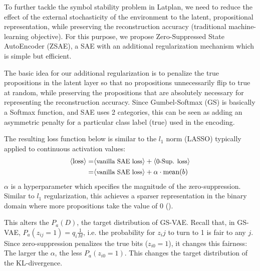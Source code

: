 
To further tackle the symbol stability problem in Latplan,
we need to reduce the effect of the external stochasticity of the environment
to the latent, propositional representation, while preserving the reconstruction accuracy
 (traditional machine-learning objective).
For this purpose, we propose Zero-Suppressed State AutoEncoder (ZSAE),
a SAE with an additional regularization mechanism which is simple but efficient.

The basic idea for our additional regularization is to penalize the
true propositions in the latent layer so that no propositions unnecessarily flip to true at random,
while preserving the propositions that are absolutely necessary for representing the reconstruction accuracy.
Since Gumbel-Softmax (GS) is basically a Softmax function,
and SAE uses 2 categories, this can be seen as adding an
asymmetric penalty for a particular class label (true) used in the encoding.

The resulting loss function below is similar to the $l_1$ norm (LASSO) typically
applied to continuous activation values:
\begin{align*}
 \brackets{\text{loss}} = & \brackets{\text{\small vanilla SAE loss}} + \brackets{\text{\small 0-Sup. loss}} \\ 
 =                        & \brackets{\text{\small vanilla SAE loss}} + \alpha\cdot\text{mean}(b)
\end{align*}
$\alpha$ is a hyperparameter which specifies the magnitude of the zero-suppression.
Similar to $l_1$ regularization, this achieves a sparser representation in the binary domain where
 more propositions take the value of 0 ().

This alters the $P_a(D)$, the target distribution of GS-VAE.
Recall that, in GS-VAE, $P_a(z_{ij}=1)=q_i\frac{1}{M}$, i.e. the probability for $z_ij$ to turn to 1 is fair to any $j$.
Since zero-suppression penalizes the true bits ($z_{i0}=1$), it changes this fairness: The larger the $\alpha$,
the less $P_a(z_{i0}=1)$. This changes the target distribution of the KL-divergence.


